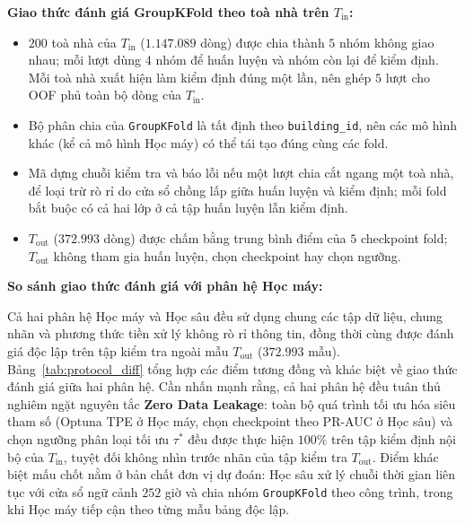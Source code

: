 \noindent\textbf{Giao thức đánh giá GroupKFold theo toà nhà trên $T_{\text{in}}$:}
\begin{itemize}
    \item $200$ toà nhà của $T_{\text{in}}$ ($1{.}147{.}089$ dòng) được chia thành $5$ nhóm không giao nhau; mỗi lượt dùng $4$ nhóm để huấn luyện và nhóm còn lại để kiểm định. Mỗi toà nhà xuất hiện làm kiểm định đúng một lần, nên ghép $5$ lượt cho OOF phủ toàn bộ dòng của $T_{\text{in}}$.
    \item Bộ phân chia của \texttt{GroupKFold} là tất định theo \texttt{building\_id}, nên các mô hình khác (kể cả mô hình Học máy) có thể tái tạo đúng cùng các fold.
    \item Mã dựng chuỗi kiểm tra và báo lỗi nếu một lượt chia cắt ngang một toà nhà, để loại trừ rò rỉ do cửa sổ chồng lấp giữa huấn luyện và kiểm định; mỗi fold bắt buộc có cả hai lớp ở cả tập huấn luyện lẫn kiểm định.
    \item $T_{\text{out}}$ ($372.993$ dòng) được chấm bằng trung bình điểm của $5$ checkpoint fold; $T_{\text{out}}$ không tham gia huấn luyện, chọn checkpoint hay chọn ngưỡng.
\end{itemize}

\noindent\textbf{So sánh giao thức đánh giá với phân hệ Học máy:}

Cả hai phân hệ Học máy và Học sâu đều sử dụng chung các tập dữ liệu, chung nhãn và phương thức tiền xử lý không rò rỉ thông tin, đồng thời cùng được đánh giá độc lập trên tập kiểm tra ngoài mẫu $T_{\text{out}}$ ($372.993$ mẫu). Bảng~\ref{tab:protocol_diff} tổng hợp các điểm tương đồng và khác biệt về giao thức đánh giá giữa hai phân hệ. Cần nhấn mạnh rằng, cả hai phân hệ đều tuân thủ nghiêm ngặt nguyên tắc \textbf{Zero Data Leakage}: toàn bộ quá trình tối ưu hóa siêu tham số (Optuna TPE ở Học máy, chọn checkpoint theo PR-AUC ở Học sâu) và chọn ngưỡng phân loại tối ưu $\tau^*$ đều được thực hiện $100\%$ trên tập kiểm định nội bộ của $T_{\text{in}}$, tuyệt đối không nhìn trước nhãn của tập kiểm tra $T_{\text{out}}$. Điểm khác biệt mấu chốt nằm ở bản chất đơn vị dự đoán: Học sâu xử lý chuỗi thời gian liên tục với cửa sổ ngữ cảnh $252$ giờ và chia nhóm \texttt{GroupKFold} theo công trình, trong khi Học máy tiếp cận theo từng mẫu bảng độc lập.

